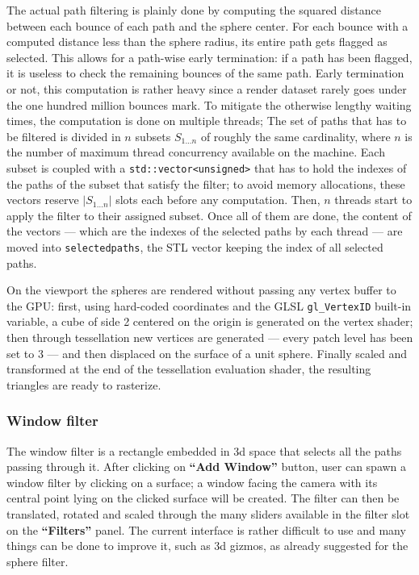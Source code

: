 The actual path filtering is plainly done by computing the squared distance between each bounce of each path and the sphere center. For each bounce with a computed distance less than the sphere radius, its entire path gets flagged as selected. This allows for a path-wise early termination: if a path has been flagged, it is useless to check the remaining bounces of the same path. Early termination or not, this computation is rather heavy since a render dataset rarely goes under the one hundred million bounces mark. To mitigate the otherwise lengthy waiting times, the computation is done on multiple threads; The set of paths that has to be filtered is divided in $n$ subsets $S_{1...n}$ of roughly the same cardinality, where $n$ is the number of maximum thread concurrency available on the machine. Each subset is coupled with a \texttt{std::vector<unsigned>} that has to hold the indexes of the paths of the subset that satisfy the filter; to avoid memory allocations, these vectors reserve $|S_{1...n}|$ slots each before any computation. Then, $n$ threads start to apply the filter to their assigned subset. Once all of them are done, the content of the vectors --- which are the indexes of the selected paths by each thread --- are moved into \texttt{selectedpaths}, the STL vector keeping the index of all selected paths.

On the viewport the spheres are rendered without passing any vertex buffer to the GPU: first, using hard-coded coordinates and the GLSL \texttt{gl\_VertexID} built-in variable, a cube of side 2 centered on the origin is generated on the vertex shader; then through tessellation new vertices are generated --- every patch level has been set to 3 --- and then displaced on the surface of a unit sphere. Finally scaled and transformed at the end of the tessellation evaluation shader, the resulting triangles are ready to rasterize.

\subsubsection{Window filter}
The window filter is a rectangle embedded in 3d space that selects all the paths passing through it. After clicking on \textbf{“Add Window”} button, user can spawn a window filter by clicking on a surface; a window facing the camera with its central point lying on the clicked surface will be created. The filter can then be translated, rotated and scaled through the many sliders available in the filter slot on the \textbf{“Filters”} panel. The current interface is rather difficult to use and many things can be done to improve it, such as 3d gizmos, as already suggested for the sphere filter.

